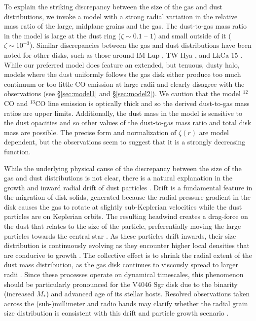 {To explain the striking discrepancy between the size of the gas and dust 
distributions, we invoke a model with a strong radial variation in the relative 
mass ratio of the large, midplane grains and the gas.  The dust-to-gas mass
ratio in the model is large at the dust ring ($\zeta \sim 0.1$ -- $1$) and small
outside of it ($\zeta \sim 10^{-3}$).  Similar discrepancies between the gas and
dust distributions have been noted for other disks, such as those around IM Lup 
\citep{panic08}, TW Hya \citep{andrews12}, and LkCa 15 \citep{isella12}.
While our preferred model does feature an extended, but tenuous, dusty halo, 
models where the dust uniformly follows the gas disk either produce too much 
continuum or too little CO emission at large radii and clearly disagree with 
the observations (see \S\ref{sec:model1} and \S\ref{sec:model2}).  We caution 
that the model $^{12}$CO and $^{13}$CO line emission is optically thick and so 
the derived dust-to-gas mass ratios are upper limits.  Additionally, the dust 
mass in the model is sensitive to the dust opacities and so other values of the
dust-to-gas mass ratio and total disk mass are possible. The precise form and 
normalization of $\zeta(r)$ are model dependent, but the observations seem to 
suggest that it is a strongly decreasing function.

While the underlying physical cause of the discrepancy between the size of the 
gas and dust distributions is not clear, there is a 
natural explanation in the growth and inward radial drift of dust particles 
\citep{weidenschilling80,brauer08,birnstiel10}.  Drift is a fundamental feature
in the migration of disk solids, generated because the radial pressure gradient
in the disk causes the gas to rotate at slightly sub-Keplerian velocities while 
the dust particles are on Keplerian orbits.  The resulting headwind creates a 
drag-force on the dust that relates to the size of the particle, preferentially
moving the large particles towards the central star \citep{weidenschilling77b,
takeuchi02}.  As these particles drift inwards, their size distribution is 
continuously evolving as they encounter higher local densities that are 
conducive to growth \citep{birnstiel10}.  The collective effect is to shrink the
radial extent of the dust mass distribution, as the gas disk continues to
viscously spread to larger radii \citep{birnstiel12a}.  Since these processes 
operate on dynamical timescales, this phenomenon should be particularly 
pronounced for the V4046 Sgr disk due to the binarity (increased $M_*$) and 
advanced age of its stellar hosts.  Resolved observations taken across the 
(sub-)millimeter and radio bands may clarify whether the radial grain size 
distribution is consistent with this drift and particle growth scenario 
\citep{guilloteau11,perez12}.

}
